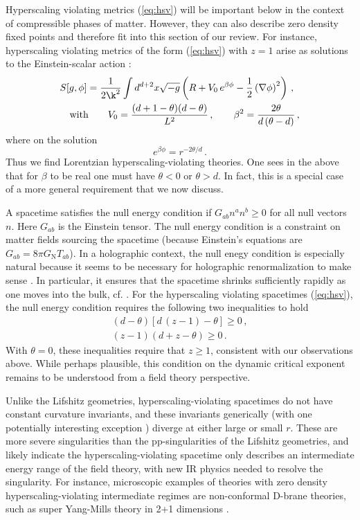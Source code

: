 \documentclass[10pt, oneside]{book}
\def\be{\begin{equation}}
\def\ee{\end{equation}}
\newcommand{\bea}{\begin{eqnarray}}
\newcommand{\eea}{\end{eqnarray}}
\begin{document}
\begin{doublespace}
Hyperscaling violating metrics (\ref{eq:hsv}) will be important below in the context of compressible phases of matter. However, they can also describe zero density fixed points and therefore fit into this section of our review. For instance, hyperscaling violating metrics of the form (\ref{eq:hsv}) with $z=1$ arise as solutions to the Einstein-scalar action \cite{Chamblin:1999ya, Charmousis:2010zz}:
\bea\label{eq:einscal}
\lefteqn{S[g,\phi] = \frac{1}{2 \k^2} \int d^{d+2}x \sqrt{-g} \left( R + V_0 \, e^{\beta \phi} - \frac{1}{2} \left( \nabla \phi \right)^2 \right) \,,}\\
&& \text{with} \qquad V_0 = \frac{(d+1-\theta)(d-\theta)}{L^2} \,, \qquad  \beta^2 = \frac{2 \theta}{d \, (\theta-d)}\,,
\eea
where on the solution
\be\label{eq:scal}
e^{\beta \phi} = r^{-2\theta/d} \,.
\ee
Thus we find Lorentzian hyperscaling-violating theories. One sees in the above that for $\beta$ to be real one must have $\theta < 0$ or $\theta > d$. In fact, this is a special case of a more general requirement that we now discuss.

A spacetime satisfies the null energy condition if $G_{ab}n^a n^b \geq 0$ for all null vectors $n$. Here $G_{ab}$ is the Einstein tensor. The null energy condition is a constraint on matter fields sourcing the spacetime (because Einstein's equations are $G_{ab} = 8\pi G_{\mathrm{N}} T_{ab}$). In a holographic context, the null enegy condition is especially natural because it seems to be necessary for holographic renormalization to make sense \cite{Freedman:1999gp}. In particular, it ensures that the spacetime shrinks sufficiently rapidly as one moves into the bulk, cf. \cite{Heemskerk:2010hk}. For the hyperscaling violating spacetimes (\ref{eq:hsv}), the null energy condition requires the following two inequalities to hold
\bea
(d-\theta)[d \, (z-1) - \theta] \geq 0 \,, \\
(z-1)(d+z - \theta) \geq 0 \,.
\eea
With $\theta = 0$, these inequalities require that $z \geq 1$, consistent with our observations above. While perhaps plausible, this condition on the dynamic critical exponent remains to be understood from a field theory perspective.

Unlike the Lifshitz geometries, hyperscaling-violating spacetimes do not have constant curvature invariants, and these invariants generically (with one potentially interesting exception \cite{Shaghoulian:2011aa, Lei:2013apa}) diverge at either large or small $r$. These are more severe singularities than the pp-singularities of the Lifshitz geometries, and likely indicate the hyperscaling-violating spacetime only describes an intermediate energy range of the field theory, with new IR physics needed to resolve the singularity. For instance, microscopic examples of theories with zero density hyperscaling-violating intermediate regimes are non-conformal D-brane theories, such as super Yang-Mills theory in 2+1 dimensions \cite{Dong:2012se}.


\end{doublespace}
\end{document}
